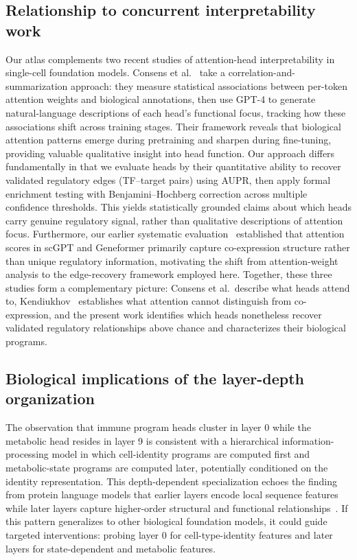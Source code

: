 \documentclass[11pt]{article}
\begin{document}
\subsection{Relationship to concurrent interpretability work}
Our atlas complements two recent studies of attention-head interpretability in single-cell foundation models. Consens et al.~\cite{consens2025attention} take a correlation-and-summarization approach: they measure statistical associations between per-token attention weights and biological annotations, then use GPT-4 to generate natural-language descriptions of each head's functional focus, tracking how these associations shift across training stages. Their framework reveals that biological attention patterns emerge during pretraining and sharpen during fine-tuning, providing valuable qualitative insight into head function. Our approach differs fundamentally in that we evaluate heads by their quantitative ability to recover validated regulatory edges (TF--target pairs) using AUPR, then apply formal enrichment testing with Benjamini--Hochberg correction across multiple confidence thresholds. This yields statistically grounded claims about which heads carry genuine regulatory signal, rather than qualitative descriptions of attention focus. Furthermore, our earlier systematic evaluation~\cite{kendiukhov2026coexpression} established that attention scores in scGPT and Geneformer primarily capture co-expression structure rather than unique regulatory information, motivating the shift from attention-weight analysis to the edge-recovery framework employed here. Together, these three studies form a complementary picture: Consens et al.\ describe what heads attend to, Kendiukhov~\cite{kendiukhov2026coexpression} establishes what attention cannot distinguish from co-expression, and the present work identifies which heads nonetheless recover validated regulatory relationships above chance and characterizes their biological programs.

\subsection{Biological implications of the layer-depth organization}
The observation that immune program heads cluster in layer 0 while the metabolic head resides in layer 9 is consistent with a hierarchical information-processing model in which cell-identity programs are computed first and metabolic-state programs are computed later, potentially conditioned on the identity representation. This depth-dependent specialization echoes the finding from protein language models that earlier layers encode local sequence features while later layers capture higher-order structural and functional relationships~\cite{rives2021esm}. If this pattern generalizes to other biological foundation models, it could guide targeted interventions: probing layer 0 for cell-type-identity features and later layers for state-dependent and metabolic features.
\end{document}
